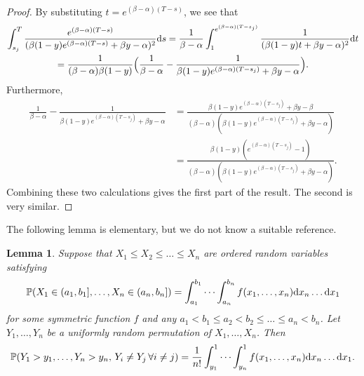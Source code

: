 \documentclass{article}
\theoremstyle{plain}
\newtheorem{lem}[thm]{Lemma}
\theoremstyle{definition}
\renewcommand{\P}{\mathbb{P}}
\renewcommand{\d}{{\rm{d}}}
\begin{document}
\begin{proof}
By substituting $t = e^{(\beta-\alpha)(T-s)}$, we see that
\begin{multline*}
\int_{s_j}^{T} \frac{e^{(\beta-\alpha)(T-s)}}{(\beta(1-y)e^{(\beta-\alpha)(T-s)}+\beta y-\alpha)^2} \d s = \frac{1}{\beta-\alpha}\int_1^{e^{(\beta-\alpha)(T-s_j)}} \frac{1}{(\beta(1-y)t + \beta y-\alpha)^2} \d t\\
= \frac{1}{(\beta-\alpha)\beta(1-y)}\Big(\frac{1}{\beta - \alpha} - \frac{1}{\beta(1-y)e^{(\beta-\alpha)(T-s_j)} + \beta y - \alpha}\Big).
\end{multline*}
Furthermore,
\begin{align*}
\frac{1}{\beta - \alpha} - \frac{1}{\beta(1-y)e^{(\beta-\alpha)(T-s_j)} + \beta y - \alpha} &= \frac{\beta(1-y)e^{(\beta-\alpha)(T-s_j)}+\beta y - \beta}{(\beta-\alpha)(\beta(1-y)e^{(\beta-\alpha)(T-s_j)} + \beta y - \alpha)}\\
&= \frac{\beta(1-y)(e^{(\beta-\alpha)(T-s_j)}-1)}{(\beta-\alpha)(\beta(1-y)e^{(\beta-\alpha)(T-s_j)} + \beta y - \alpha)}.
\end{align*}
Combining these two calculations gives the first part of the result. The second is very similar.
\end{proof}



The following lemma is elementary, but we do not know a suitable reference.

\begin{lem}\label{unordering}
Suppose that $X_1\le X_2\le \ldots \le X_n$ are ordered random variables satisfying
\[\P(X_1\in(a_1,b_1],\ldots,X_n\in(a_n,b_n]) = \int_{a_1}^{b_1}\cdots\int_{a_n}^{b_n} f(x_1,\ldots,x_n) \d x_n\ldots\d x_1\]
for some symmetric function $f$ and any $a_1<b_1\le a_2<b_2\le\ldots\le a_n < b_n$. Let $Y_1,\ldots,Y_n$ be a uniformly random permutation of $X_1,\ldots,X_n$. Then
\[\P(Y_1 > y_1,\ldots,Y_n>y_n,\, Y_i\neq Y_j \,\forall i\neq j) = \frac{1}{n!}\int_{y_1}^1\cdots\int_{y_n}^1 f(x_1,\ldots,x_n) \d x_n\ldots\d x_1.\]
\end{lem}
\end{document}
